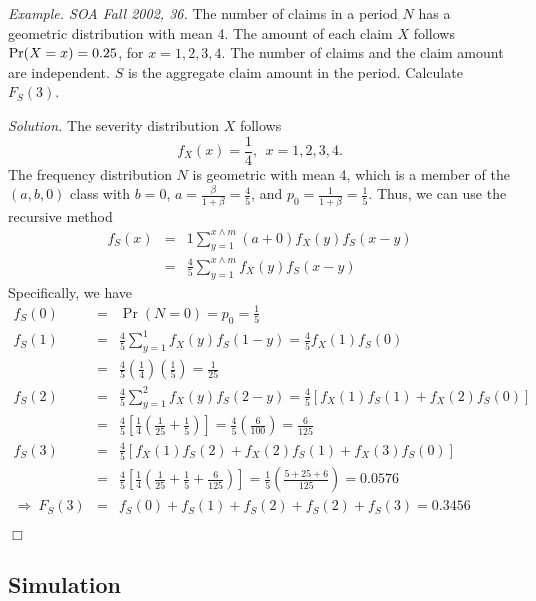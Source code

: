 \documentclass[12pt,letterpaper]{article}
\begin{document}


\noindent \textit{Example. SOA Fall 2002, 36.} The number of claims in a period $N$ has a geometric distribution with mean 4. The amount of each claim $X$ follows ${\rm Pr} (X = x) = 0.25$, for $x = 1,2,3,4$. The number of claims and the claim amount are independent. $S$ is the aggregate claim amount in the period. Calculate $F_S(3)$.

\bigskip

\noindent \textit{Solution.} The severity distribution $X$ follows
$$f_X (x) = \frac{1}{4}, \ \ x=1, 2, 3, 4.$$
The frequency distribution $N$ is geometric with mean 4, which is a member of the $(a,b,0)$ class with $b=0$, $a=\frac{\beta}{1+\beta} = \frac{4}{5}$, and $p_0 = \frac{1}{1+\beta} = \frac{1}{5}$. Thus, we can use the recursive method
\begin{eqnarray*}
f_S (x) &=& 1 \sum_{y=1}^{x\wedge m} (a+0) f_X (y) f_S (x-y) \\
&=& \frac{4}{5} \sum_{y=1}^{x\wedge m} f_X (y) f_S (x-y)
\end{eqnarray*}
Specifically, we have
\begin{eqnarray*}
f_S (0) &=& \Pr(N=0) = p_0=\frac{1}{5}\\
f_S (1) &=& \frac{4}{5}\sum_{y=1}^{1} f_X (y) f_S (1-y) = \frac{4}{5} f_X(1) f_S(0)\\
&=& \frac{4}{5}\left( \frac{1}{4}\right)\left(\frac{1}{5} \right) = \frac{1}{25}\\
f_S (2) &=&  \frac{4}{5}\sum_{y=1}^{2} f_X (y) f_S (2-y) = \frac{4}{5} \left[ f_X(1)f_S(1) + f_X(2) f_S(0) \right] \\
&=& \frac{4}{5}\left[ \frac{1}{4} \left( \frac{1}{25} + \frac{1}{5}\right) \right] =
\frac{4}{5}\left( \frac{6}{100}\right) = \frac{6}{125}\\
f_S (3) &=& \frac{4}{5} \left[ f_X(1) f_S(2) + f_X(2)f_S(1) + f_X(3) f_S(0) \right]\\
&=& \frac{4}{5}\left[ \frac{1}{4} \left( \frac{1}{25} + \frac{1}{5} +
\frac{6}{125}\right) \right] = \frac{1}{5}\left( \frac{5+25+6}{125}\right) = 0.0576\\
\Rightarrow \ F_S (3) &=& f_S (0)+f_S (1)+f_S (2)+f_S (2)+f_S (3) = 0.3456
\end{eqnarray*}
\begin{flushright}$\Box$\end{flushright}



\subsection{Simulation}
\end{document}
